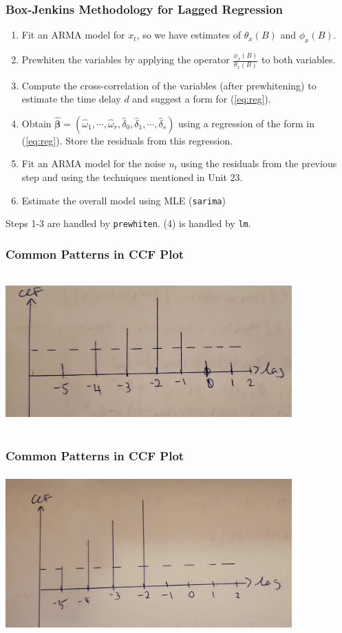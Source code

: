 \documentclass[%
xcolor=pdftex]{beamer}
\begin{document}
\begin{frame}[fragile]
\frametitle{Box-Jenkins Methodology for Lagged Regression}

\begin{enumerate}

\item Fit an ARMA model for $x_t$, so we have estimates of $\theta_x(B)$ and $\phi_x(B)$.
\item Prewhiten the variables by applying the operator $\frac{\phi_x(B)}{\theta_x(B)}$ to both variables.
\item Compute the cross-correlation of the variables (after prewhitening) to estimate the time delay $d$ and suggest a form for (\ref{eq:reg}).
\item Obtain $\boldsymbol{\hat{\beta}} = (\hat{\omega}_1, \cdots, \hat{\omega}_r, \hat{\delta}_0, \hat{\delta}_1, \cdots, \hat{\delta}_s)$ using a regression of the form in (\ref{eq:reg}). Store the residuals from this regression.
\item Fit an ARMA model for the noise $u_t$ using the residuals from the previous step and using the techniques mentioned in Unit 23. 
\item Estimate the overall model using MLE (\verb|sarima|)
\end{enumerate}
Steps 1-3 are handled by \verb|prewhiten|. (4) is handled by \verb|lm|.
\end{frame}

\begin{frame}
\frametitle{Common Patterns in CCF Plot}

\includegraphics[width=110mm, height=60mm]{slide23.jpg}

\end{frame}

\begin{frame}
\frametitle{Common Patterns in CCF Plot}

\includegraphics[width=110mm, height=60mm]{slide24.jpg}

\end{frame}
\end{document}
